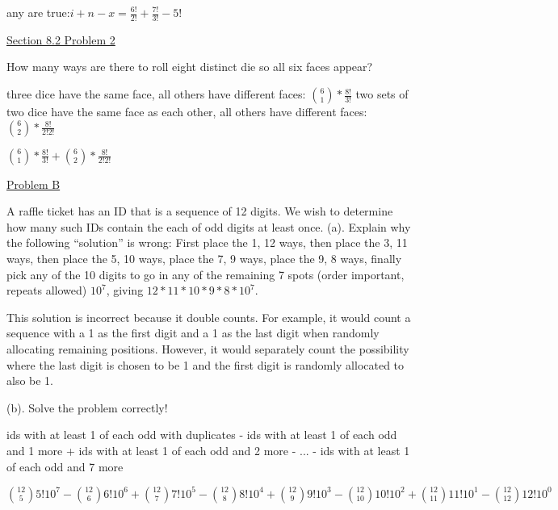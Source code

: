 \documentclass{article}
\begin{document}
any are true:$i+n-x=\frac{6!}{2!}+\frac{7!}{3!}-5!$\newline{}

\underline{Section 8.2 Problem 2}

How many ways are there to roll eight distinct die so all six faces appear?\newline{}

three dice have the same face, all others have different faces: $\binom{6}{1}*\frac{8!}{3!}$
two sets of two dice have the same face as each other, all others have different faces: $\binom{6}{2}*\frac{8!}{2!2!}$\newline{}

$\binom{6}{1}*\frac{8!}{3!}+\binom{6}{2}*\frac{8!}{2!2!}$\newline{}

\underline{Problem B}

A raffle ticket has an ID that is a sequence of 12 digits. We wish to determine how many such IDs contain the each of odd digits at least once. \newline{}
(a). Explain why the following “solution” is wrong: First place the 1, 12 ways, then place the 3, 11 ways, then place the 5, 10 ways, place the 7, 9 ways, place the 9, 8 ways, finally pick any of the 10 digits to go in any of the remaining 7 spots (order important, repeats allowed) $10^7$, giving $12 * 11 * 10 * 9 * 8 * 10^7.$ \newline{}

This solution is incorrect because it double counts. For example, it would count a sequence with a 1 as the first digit and a 1 as the last digit when randomly allocating remaining positions. However, it would separately count the possibility where the last digit is chosen to be 1 and the first digit is randomly allocated to also be 1.  

(b). Solve the problem correctly!\newline{}

ids with at least 1 of each odd with duplicates - ids with at least 1 of each odd and 1 more + ids with at least 1 of each odd and 2 more - ... - ids with at least 1 of each odd and 7 more

$\binom{12}{5} 5! 10^7 - \binom{12}{6} 6! 10^6 + \binom{12}{7} 7! 10^5 - \binom{12}{8} 8! 10^{4} + \binom{12}{9} 9! 10^{3} - \binom{12}{10} 10! 10^2 + \binom{12}{11} 11! 10^1 - \binom{12}{12} 12! 10^0$
\end{document}
